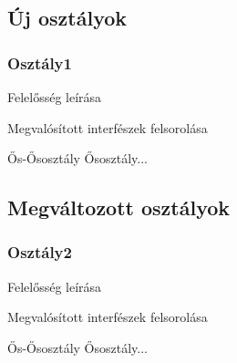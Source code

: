 \subsection{Új osztályok}
\subsubsection{Osztály1}
\begin{class-template-responsibility}
    Felelősség leírása
\end{class-template-responsibility}
\begin{class-template-interface}
    Megvalósított interfészek felsorolása
\end{class-template-interface}
\begin{class-template-baseclass}
    Ős-Ősosztály \baseclass Ősosztály... 
\end{class-template-baseclass}
\begin{class-template-attribute}
\end{class-template-attribute}
\begin{class-template-method}
\end{class-template-method}

\subsection{Megváltozott osztályok}
\subsubsection{Osztály2}
\begin{class-template-responsibility}
    Felelősség leírása
\end{class-template-responsibility}
\begin{class-template-interface}
    Megvalósított interfészek felsorolása
\end{class-template-interface}
\begin{class-template-baseclass}
    Ős-Ősosztály \baseclass Ősosztály... 
\end{class-template-baseclass}
\begin{class-template-attribute}
\end{class-template-attribute}
\begin{class-template-method}
\end{class-template-method}

